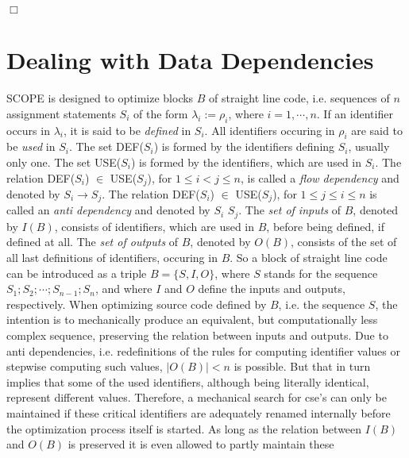 \begin{flushright}
$\Box$
\end{flushright}
\newpage
\section{Dealing with Data Dependencies}\label{SCOPE:dda}

SCOPE is designed to optimize blocks $B$ of straight line code, i.e.
sequences of $n$ assignment statements $S_i$ of the 
form ${\lambda}_i := {\rho}_i$, where $i = 1, \cdots , n$. If an identifier 
occurs in ${\lambda}_i$, it is said to be {\em defined} in $S_i$. All 
identifiers occuring in ${\rho}_i$ are said to be {\em used} in $S_i$. 
The set DEF($S_i$)
is formed by the identifiers defining $S_i$, usually only one.
The set USE($S_i$) is formed by the identifiers, which are used in $S_i$.
The relation DEF($S_i$) $\in$ USE($S_j$), for $1 \leq i < j \leq n$, is 
called  a {\em flow dependency} and denoted by $S_i \rightarrow S_j$. The
relation DEF($S_i$) $\in$ USE($S_j$), for $1 \leq j \leq i \leq n$ is called
an {\em anti dependency} and denoted by $S_i$ \ad $S_j$. The {\em set of inputs}
of $B$, denoted by $I(B)$, consists of identifiers, which are used
in $B$, before being defined, if defined at all. The {\em set of outputs} of
$B$, denoted by $O(B)$, consists of the set of all last definitions of
identifiers, occuring in $B$. So a block of straight line code can be 
introduced as a triple $B = \{ S, I, O \}$, where $S$ stands for the sequence
$S_1 ; S_2 ; \cdots ; S_{n-1} ; S_n$, and where $I$ and $O$ define the
inputs and outputs, respectively. When optimizing source code defined by $B$,
i.e. the sequence $S$, the intention is to mechanically produce an equivalent,
but computationally less complex sequence, preserving the relation between
inputs and outputs. Due to anti dependencies, i.e. redefinitions of the rules
for computing identifier values or stepwise computing such values, 
 $\mid O(B) \mid < n$ is possible.  But that in turn implies that some of the
used identifiers, although being literally identical, represent different
values. Therefore, a mechanical search for cse's can only be maintained if 
these critical identifiers are adequately renamed internally before the 
optimization process itself is started. As long as the relation between
$I(B)$ and $O(B)$ is preserved it is even allowed to partly maintain these
